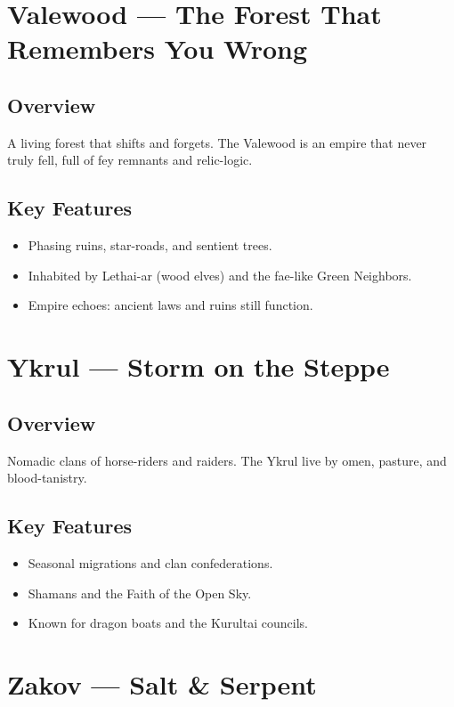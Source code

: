 \section{Valewood — The Forest That Remembers You Wrong}
\label{sec:lore-valewood}

\subsection*{Overview}
A living forest that shifts and forgets. The Valewood is an empire that never truly fell, full of fey remnants and relic-logic.

\subsection*{Key Features}
\begin{itemize}[leftmargin=*]
    \item Phasing ruins, star-roads, and sentient trees.
    \item Inhabited by Lethai-ar (wood elves) and the fae-like Green Neighbors.
    \item Empire echoes: ancient laws and ruins still function.
\end{itemize}

\section{Ykrul — Storm on the Steppe}
\label{sec:lore-ykrul}

\subsection*{Overview}
Nomadic clans of horse-riders and raiders. The Ykrul live by omen, pasture, and blood-tanistry.

\subsection*{Key Features}
\begin{itemize}[leftmargin=*]
    \item Seasonal migrations and clan confederations.
    \item Shamans and the Faith of the Open Sky.
    \item Known for dragon boats and the Kurultai councils.
\end{itemize}

\section{Zakov — Salt \& Serpent}
\label{sec:lore-zakov}


